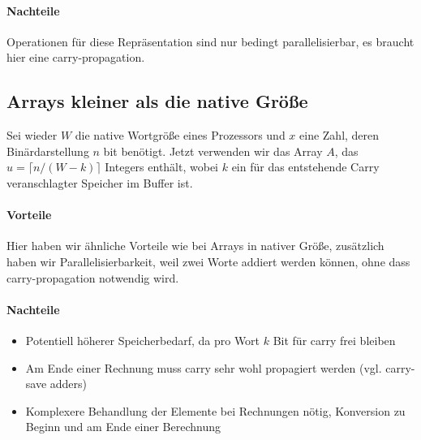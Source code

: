 \paragraph{Nachteile}

Operationen für diese Repräsentation sind nur bedingt parallelisierbar, es braucht hier eine carry-propagation.

\subsection{Arrays kleiner als die native Größe}

Sei wieder $W$ die native Wortgröße eines Prozessors und $x$ eine Zahl, deren Binärdarstellung $n$ bit benötigt. Jetzt verwenden wir das Array $A$, das 
$u = \lceil n/(W-k) \rceil$ Integers enthält, wobei $k$ ein für das entstehende Carry veranschlagter Speicher im Buffer ist.

\paragraph{Vorteile}

Hier haben wir ähnliche Vorteile wie bei Arrays in nativer Größe, zusätzlich haben wir Parallelisierbarkeit, weil zwei Worte addiert werden können, ohne dass carry-propagation 
notwendig wird.

\paragraph{Nachteile}

\begin{itemize}
    \item Potentiell höherer Speicherbedarf, da pro Wort $k$ Bit für carry frei bleiben
    \item Am Ende einer Rechnung muss carry sehr wohl propagiert werden (vgl. carry-save adders)
    \item Komplexere Behandlung der Elemente bei Rechnungen nötig, Konversion zu Beginn und am Ende einer Berechnung
\end{itemize}